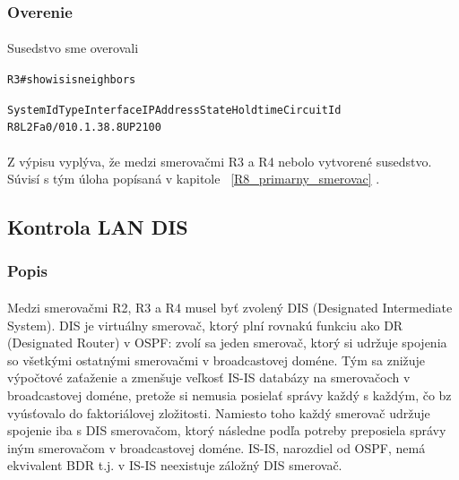 \documentclass[12pt,twoside,a4paper]{report}
\begin{document}
\subsubsection{Overenie}
\paragraph{}
Susedstvo sme overovali 

\noindent
{\selectfont
\begin{small}
\begin{alltt}
R3#show isis neighbors

System Id      Type Interface   IP Address      State Holdtime Circuit Id
R8             L2   Fa0/0       10.1.38.8       UP    21       00

\end{alltt}
\end{small}
}

\paragraph{}
Z výpisu vyplýva, že medzi smerovačmi R3 a R4 nebolo vytvorené susedstvo. Súvisí s tým úloha popísaná v kapitole ~\ref{R8_primarny_smerovac} .






\subsection{Kontrola LAN DIS}
\label{kontrola_lan_dis}
\subsubsection{Popis}
\paragraph{}
Medzi smerovačmi R2, R3 a R4 musel byť zvolený DIS (Designated Intermediate System). DIS je virtuálny smerovač, ktorý plní rovnakú funkciu ako DR (Designated Router) v OSPF: zvolí sa jeden smerovač, ktorý si udržuje spojenia so všetkými ostatnými smerovačmi v broadcastovej doméne. Tým sa znižuje výpočtové zaťaženie a zmenšuje veľkosť IS-IS databázy na smerovačoch v broadcastovej doméne, pretože si nemusia posielať správy každý s každým, čo bz vyúsťovalo do faktoriálovej zložitosti. Namiesto toho každý smerovač udržuje spojenie iba s DIS smerovačom, ktorý následne podľa potreby preposiela správy iným smerovačom v broadcastovej doméne. IS-IS, narozdiel od OSPF, nemá ekvivalent BDR t.j. v IS-IS neexistuje záložný DIS smerovač.
\end{document}

